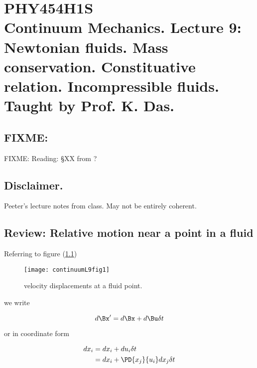 
%

\chapter{PHY454H1S\\Continuum Mechanics.  Lecture 9: Newtonian fluids.  Mass conservation.  Constituative relation.  Incompressible fluids.  Taught by Prof. K. Das.}
\label{chap:continuumL9}
{}
\date{Feb 8, 2012}

\beginArtWithToc

\section{FIXME:}

FIXME: Reading: \S XX from \cite{acheson1990elementary}?

\section{Disclaimer.}

Peeter's lecture notes from class.  May not be entirely coherent.

\section{Review: Relative motion near a point in a fluid}

Referring to figure (\ref{fig:continuumL9:continuumL9fig1})
\begin{figure}[htp]
   \centering
   \texttt{[image: continuumL9fig1]}
   \caption{velocity displacements at a fluid point.}\label{fig:continuumL9:continuumL9fig1}
\end{figure}

we write

\begin{equation}\label{eqn:continuumL9:10}
d\Bx' = d\Bx + d\Bu \delta t
\end{equation}

or in coordinate form

\begin{equation}\label{eqn:continuumL9:30}
\begin{aligned}
dx_i 
&= dx_i + du_i \delta t \\
&= dx_i + \PD{x_j}{u_i} dx_j \delta t 
\end{aligned}
\end{equation}

